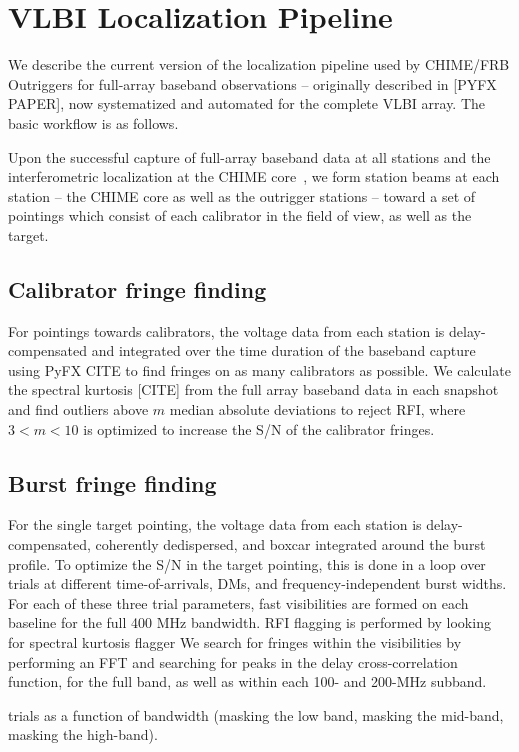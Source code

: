 \documentclass[twocolumn]{aastex631}
\begin{document}
\section{VLBI Localization Pipeline}
We describe the current version of the localization pipeline used by CHIME/FRB Outriggers for full-array baseband observations -- originally described in [PYFX PAPER], now systematized and automated for the complete VLBI array. The basic workflow is as follows.

Upon the successful capture of full-array baseband data at all stations and the interferometric localization at the CHIME core~\citep{michilli2021analysis}, we form station beams at each station -- the CHIME core as well as the outrigger stations -- toward a set of pointings which consist of each calibrator in the field of view, as well as the target.

\subsection{Calibrator fringe finding}
For pointings towards calibrators, the voltage data from each station is delay-compensated and integrated over the time duration of the baseband capture using PyFX CITE to find fringes on as many calibrators as possible. We calculate the spectral kurtosis [CITE] from the full array baseband data in each snapshot and find outliers above $m$ median absolute deviations to reject RFI, where $3 < m < 10$ is optimized to increase the S/N of the calibrator fringes.

\subsection{Burst fringe finding}
For the single target pointing, the voltage data from each station is delay-compensated, coherently dedispersed, and boxcar integrated around the burst profile. To optimize the S/N in the target pointing, this is done in a loop over trials at different time-of-arrivals, DMs, and frequency-independent burst widths. For each of these three trial parameters, fast visibilities are formed on each baseline for the full 400 MHz bandwidth. RFI flagging is performed by looking for spectral kurtosis flagger
We search for fringes within the visibilities by performing an FFT and searching for peaks in the delay cross-correlation function, for the full band, as well as within each 100- and 200-MHz subband. 

trials as a function of bandwidth (masking the low band, masking the mid-band, masking the high-band).
\end{document}

